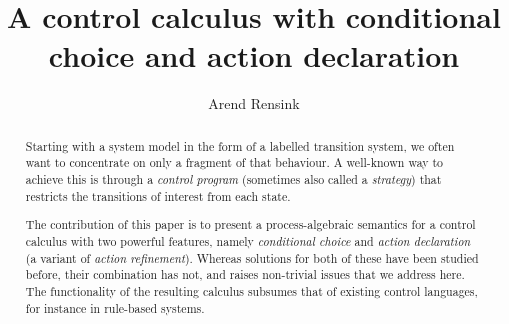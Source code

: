 \title{A control calculus with conditional choice and action declaration}
\author{Arend Rensink}
\maketitle

\begin{abstract}
Starting with a system model in the form of a labelled transition system, we often want to concentrate on only a fragment of that behaviour. A well-known way to achieve this is through a \emph{control program} (sometimes also called a \emph{strategy}) that restricts the transitions of interest from each state.

The contribution of this paper is to present a process-algebraic semantics for a control calculus with two powerful features, namely \emph{conditional choice} and \emph{action declaration} (a variant of \emph{action refinement}). Whereas solutions for both of these have been studied before, their combination has not, and raises non-trivial issues that we address here. The functionality of the resulting calculus subsumes that of existing control languages, for instance in rule-based systems.
\end{abstract}
